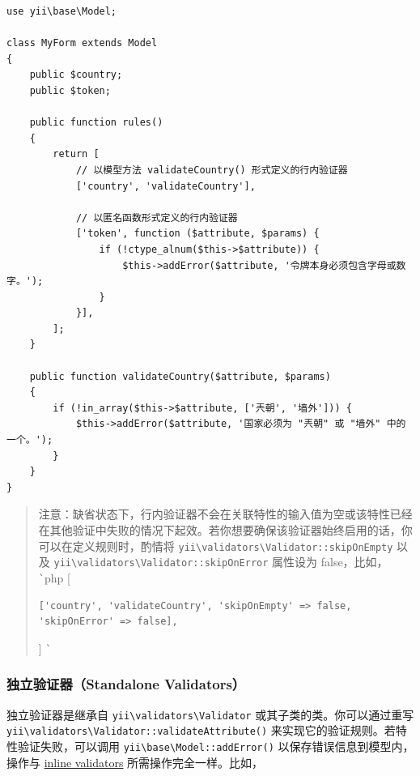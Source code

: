 \lstset{language=php}\begin{lstlisting}
use yii\base\Model;

class MyForm extends Model
{
    public $country;
    public $token;

    public function rules()
    {
        return [
            // 以模型方法 validateCountry() 形式定义的行内验证器
            ['country', 'validateCountry'],

            // 以匿名函数形式定义的行内验证器
            ['token', function ($attribute, $params) {
                if (!ctype_alnum($this->$attribute)) {
                    $this->addError($attribute, '令牌本身必须包含字母或数字。');
                }
            }],
        ];
    }

    public function validateCountry($attribute, $params)
    {
        if (!in_array($this->$attribute, ['兲朝', '墙外'])) {
            $this->addError($attribute, '国家必须为 "兲朝" 或 "墙外" 中的一个。');
        }
    }
}
\end{lstlisting}
\begin{quote}注意：缺省状态下，行内验证器不会在关联特性的输入值为空或该特性已经在其他验证中失败的情况下起效。若你想要确保该验证器始终启用的话，你可以在定义规则时，酌情将 \texttt{yii{\allowbreak{}\textbackslash}validators{\allowbreak{}\textbackslash}Validator\allowbreak{}::\allowbreak{}skipOnEmpty} 以及 \texttt{yii{\allowbreak{}\textbackslash}validators{\allowbreak{}\textbackslash}Validator\allowbreak{}::\allowbreak{}skipOnError}
  属性设为 false，比如，
\lstinline|`|php
[

\begin{lstlisting}
['country', 'validateCountry', 'skipOnEmpty' => false, 'skipOnError' => false],
\end{lstlisting}
]
\lstinline|`|

\end{quote}
\subsubsection{独立验证器（Standalone Validators） \label{input-validation.md::standalone-validators}}
独立验证器是继承自 \texttt{yii{\allowbreak{}\textbackslash}validators{\allowbreak{}\textbackslash}Validator} 或其子类的类。你可以通过重写
\texttt{yii{\allowbreak{}\textbackslash}validators{\allowbreak{}\textbackslash}Validator\allowbreak{}::\allowbreak{}validateAttribute()} 来实现它的验证规则。若特性验证失败，可以调用
\texttt{yii{\allowbreak{}\textbackslash}base{\allowbreak{}\textbackslash}Model\allowbreak{}::\allowbreak{}addError()} 以保存错误信息到模型内，操作与 \hyperref[input-validation.md::::inline-validators]{inline validators} 所需操作完全一样。比如，

